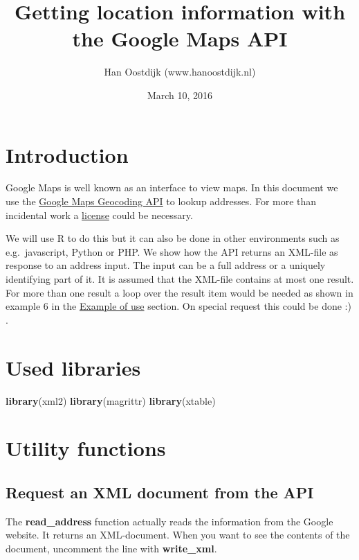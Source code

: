 \documentclass[]{article}
\title{Getting location information with the Google Maps API}
\author{Han Oostdijk (www.hanoostdijk.nl)}
\date{March 10, 2016}
\newenvironment{Shaded}{\begin{snugshade}}{\end{snugshade}}
\newcommand{\KeywordTok}[1]{\textcolor[rgb]{0.13,0.29,0.53}{\textbf{{#1}}}}
\newcommand{\NormalTok}[1]{{#1}}
\newcommand{\mytextbf}[1]{\textbf{#1}}
\begin{document}
\maketitle

\section{Introduction}\label{introduction}

Google Maps is well known as an interface to view maps. In this document
we use the
\href{https://developers.google.com/maps/web-services/}{Google Maps
Geocoding API} to lookup addresses. For more than incidental work a
\href{https://developers.google.com/maps/documentation/geolocation/usage-limits}{license}
could be necessary.

We will use R to do this but it can also be done in other environments
such as e.g.~javascript, Python or PHP. We show how the API returns an
XML-file as response to an address input. The input can be a full
address or a uniquely identifying part of it. It is assumed that the
XML-file contains at most one result. For more than one result a loop
over the result item would be needed as shown in example 6 in the
\protect\hyperlink{Exampleofuse}{Example of use} section. On special
request this could be done :) .

\section{Used libraries}\label{used-libraries}

\begin{Shaded}
\begin{Highlighting}[]
\KeywordTok{library}\NormalTok{(xml2)}
\KeywordTok{library}\NormalTok{(magrittr)}
\KeywordTok{library}\NormalTok{(xtable)}
\end{Highlighting}
\end{Shaded}

\section{Utility functions}\label{utility-functions}

\subsection{Request an XML document from the
API}\label{request-an-xml-document-from-the-api}

The \mytextbf{read\_address} function actually reads the information
from the Google website. It returns an XML-document. When you want to
see the contents of the document, uncomment the line with
\mytextbf{write\_xml}.
\end{document}
